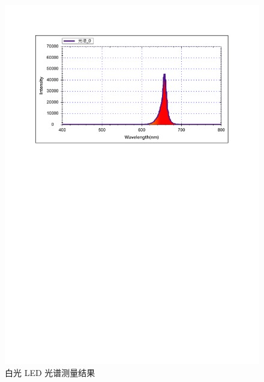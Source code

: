 \documentclass[UTF8]{article}
\theoremstyle{MyLineTheoremStyle} %
\theoremstyle{MyBlockTheoremStyle} %
\theoremstyle{MySubsubsectionStyle} %
\begin{document}
\begin{figure}[H]\centering
    \includegraphics[width=\columnwidth]{assets/5 光谱仪/红光激光.pdf}
    \caption{白光 LED 光谱测量结果}
\end{figure}
\end{document}
